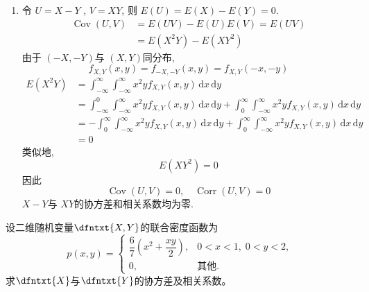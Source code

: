\documentclass[../main.tex]{subfiles}
\begin{document}
\begin{solution}
\begin{enumerate}
        \item  令 \(  U= X-Y  \) , \(  V= XY  \), 则 \(  E\left( U \right)= E\left( X \right)-E\left( Y \right)= 0     \).  \[
        \begin{aligned}
        \operatorname{Cov}\left( U,V \right)&= E\left( UV \right)-E\left( U \right)E\left( V \right)= E\left( UV \right)\\ 
         &= E\left( X^{2}Y \right)-E\left( XY^{2} \right)      
        \end{aligned}
        \]   由于 \(  \left( -X,-Y \right)   \)与 \(  \left( X,Y \right)   \)同分布,   \[
     f_{X,Y}\left( x,y \right) =  f_{-X,-Y}\left( x,y \right)= f_{X,Y}\left( -x,-y \right)  
     \] \[
        \begin{aligned}
        E\left( X^{2}Y \right)&= \int_{-\infty}^{\infty}\int_{-\infty}^{\infty}x^{2}y f_{X,Y}\left( x,y \right)\,\mathrm{d} x\,\mathrm{d} y\\ 
          &= \int_{-\infty}^{0}\int_{-\infty}^{\infty}x^{2}y f_{X,Y}\left( x,y \right)\,\mathrm{d} x\,\mathrm{d} y+ \int_{0}^{\infty}\int_{-\infty}^{\infty}x^{2}y f_{X,Y}\left( x,y \right)  \,\mathrm{d} x\,\mathrm{d} y\\ 
           &= -\int_{0}^{\infty}\int_{-\infty}^{\infty}x^{2}y f_{X,Y}\left( x,y \right)\,\mathrm{d} x\,\mathrm{d} y+  \int_{0}^{\infty}\int_{-\infty}^{\infty}x^{2}yf_{X,Y}\left( x,y \right)\,\mathrm{d} x\,\mathrm{d} y\\ 
            &= 0 
        \end{aligned}  
        \]类似地,  \[
        E\left( XY^{2} \right)= 0 
        \] 因此 \[
        \operatorname{Cov}\left( U,V \right)= 0,\quad \operatorname{Corr}\left( U,V \right)= 0  
        \]\(  X-Y  \)与 \(  XY  \)的协方差和相关系数均为零.  
    \end{enumerate}
  
\end{solution}

\begin{exercise}{}{}
设二维随机变量\(\dfntxt{X,Y}\)的联合密度函数为
\[
p(x,y)=
\begin{cases}
\dfrac{6}{7}\left(x^{2}+\dfrac{xy}{2}\right), & 0<x<1,\;0<y<2,\\[4pt]
0, & \text{其他}.
\end{cases}
\]
求\(\dfntxt{X}\)与\(\dfntxt{Y}\)的协方差及相关系数。
\end{exercise}
\end{document}
